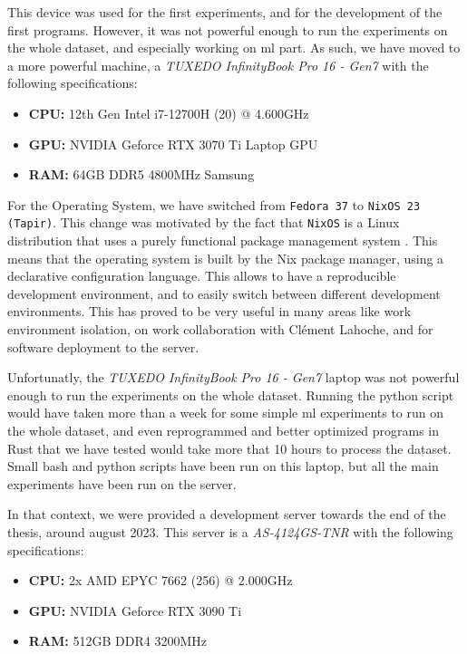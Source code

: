     This device was used for the first experiments, and for the development of the first programs. However, it was not powerful enough to run the experiments on the whole dataset, and especially working on \acrshort{ml} part. As such, we have moved to a more powerful machine, a \textit{TUXEDO InfinityBook Pro 16 - Gen7} with the following specifications:

    \begin{itemize}
        \item \textbf{CPU:} 12th Gen Intel i7-12700H (20) @ 4.600GHz
        \item \textbf{GPU:} NVIDIA Geforce RTX 3070 Ti Laptop GPU
        \item \textbf{RAM:} 64GB DDR5 4800MHz Samsung
    \end{itemize}

    For the Operating System, we have switched from \texttt{Fedora 37} to \texttt{NixOS 23 (Tapir)}. This change was motivated by the fact that \texttt{NixOS} is a Linux distribution that uses a purely functional package management system \cite{NixOS08}. This means that the operating system is built by the Nix package manager, using a declarative configuration language. This allows to have a reproducible development environment, and to easily switch between different development environments. This has proved to be very useful in many areas like work environment isolation, on work collaboration with Clément Lahoche, and for software deployment to the server.
    
    Unfortunatly, the \textit{TUXEDO InfinityBook Pro 16 - Gen7} laptop was not powerful enough to run the experiments on the whole dataset. Running the python script would have taken more than a week for some simple \acrshort{ml} experiments to run on the whole dataset, and even reprogrammed and better optimized programs in Rust that we have tested would take more that 10 hours to process the dataset. Small bash and python scripts have been run on this laptop, but all the main experiments have been run on the server.
    
    In that context, we were provided a development server towards the end of the thesis, around august 2023. This server is a \textit{AS-4124GS-TNR} with the following specifications:

    \begin{itemize}
        \item \textbf{CPU:} 2x AMD EPYC 7662 (256) @ 2.000GHz
        \item \textbf{GPU:} NVIDIA Geforce RTX 3090 Ti
        \item \textbf{RAM:} 512GB DDR4 3200MHz
    \end{itemize}

